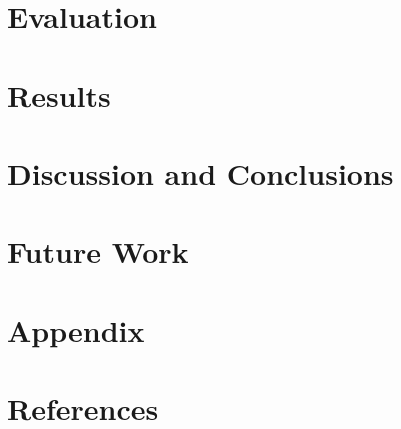\documentclass{article}
\begin{document}
\section{Evaluation}

\section{Results}

\section{Discussion and Conclusions}
\section{Future Work}

\section{Appendix}

\section{References}
\end{document}
